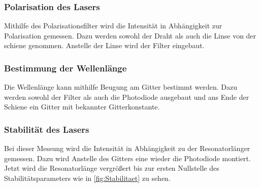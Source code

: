 \subsubsection{Polarisation des Lasers}
Mithilfe des Polarisationsfilter wird die Intensität in Abhängigkeit zur Polarisation gemessen. Dazu werden sowohl der Draht als auch die Linse von der schiene genommen. Anstelle der Linse wird der Filter eingebaut.
\subsubsection{Bestimmung der Wellenlänge}

Die Wellenlänge kann mithilfe Beugung am Gitter bestimmt werden. Dazu werden sowohl der Filter als auch die Photodiode ausgebaut und ans Ende der Schiene ein Gitter mit bekannter Gitterkonstante.
\subsubsection{Stabilität des Lasers}

Bei dieser Messung wird die Intensität in Abhängigkeit zu der Resonatorlänger gemessen. Dazu wird Anstelle des Gitters eine wieder die Photodiode montiert. Jetzt wird die Resonatorlänge vergrößert bis zur ersten Nullstelle des Stabilitätsparameters wie in  \cref{fig:Stabilitaet} zu sehen.


